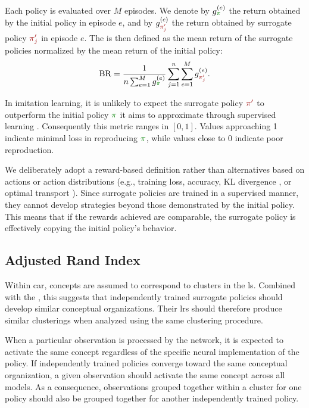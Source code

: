 Each policy is evaluated over $M$ episodes.
We denote by $g^{(e)}_{\InitialPolicy}$ the return obtained by the initial policy in episode $e$, and by $g^{(e)}_{\SurrogatePolicy{j}}$ the return obtained by surrogate policy $\SurrogatePolicy{j}$ in episode $e$.
The \BehaviorReconstructionName{} is then defined as the mean return of the surrogate policies normalized by the mean return of the initial policy:
\begin{align}
    \BR = \frac{1}{n \sum_{e=1}^{M} g^{(e)}_{\InitialPolicy}} \sum_{j=1}^{n} \sum_{e=1}^{M} g^{(e)}_{\SurrogatePolicy{j}}.
\end{align}

In imitation learning, it is unlikely to expect the surrogate policy $\SurrogatePolicy{}$ to outperform the initial policy $\InitialPolicy$ it aims to approximate through supervised learning \parencite{pmlr-v9-ross10a}.
Consequently this metric ranges in $[0,1]$.
Values approaching 1 indicate minimal loss in reproducing $\InitialPolicy$, while values close to 0 indicate poor reproduction.  

We deliberately adopt a reward-based definition rather than alternatives based on actions or action distributions (e.g., training loss, accuracy, KL divergence \parencite{shlens2014noteskullbackleiblerdivergencelikelihood}, or optimal transport \parencite{peyré2020computationaloptimaltransport}).
Since surrogate policies are trained in a supervised manner, they cannot develop strategies beyond those demonstrated by the initial policy.
This means that if the rewards achieved are comparable, the surrogate policy is effectively copying the initial policy's behavior.

\subsection{Adjusted Rand Index}
\label{subsec:adjusted_rand_index}

Within \gls{car}, concepts are assumed to correspond to clusters in the \gls{ls}.
Combined with the \RepresentationConvergenceHypothesisName, this suggests that independently trained surrogate policies should develop similar conceptual organizations.
Their \glspl{lr} should therefore produce similar clusterings when analyzed using the same clustering procedure.

When a particular observation is processed by the network, it is expected to activate the same concept regardless of the specific neural implementation of the policy.
If independently trained policies converge toward the same conceptual organization, a given observation should activate the same concept across all models.
As a consequence, observations grouped together within a cluster for one policy should also be grouped together for another independently trained policy.

